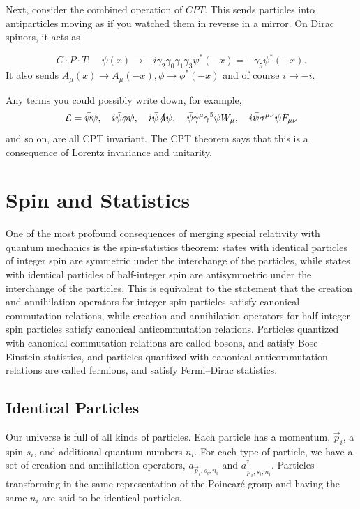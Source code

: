 \documentclass[11pt]{article}
\theoremstyle{definition}
\begin{document}
Next, consider the combined operation of \( CPT \). This sends particles into antiparticles moving as if you watched them in reverse in a mirror. On Dirac spinors, it acts as
\begin{shaded}
\begin{equation}
C \cdot P \cdot T : \quad \psi(x) \rightarrow -i\gamma_2\gamma_0\gamma_1\gamma_3\psi^*(-x) = -\gamma_5\psi^*(-x).
\end{equation}
It also sends \( A_{\mu}(x) \rightarrow A_{\mu}(-x), \phi \rightarrow \phi^*(-x) \) and of course \( i \rightarrow -i \).
\end{shaded}

Any terms you could possibly write down, for example,
\begin{equation}
\mathcal{L} = \bar{\psi}\psi, \quad i\bar{\psi}\phi\psi, \quad i\bar{\psi}\slashed{A}\psi, \quad \bar{\psi}\gamma^{\mu}\gamma^5\psi W_{\mu}, \quad i\bar{\psi}\sigma^{\mu\nu}\psi F_{\mu\nu}
\end{equation}
and so on, are all CPT invariant. The CPT theorem says that this is a consequence of Lorentz invariance and unitarity.

\section{Spin and Statistics}
One of the most profound consequences of merging special relativity with quantum mechanics is the spin-statistics theorem: states with identical particles of integer spin are symmetric under the interchange of the particles, while states with identical particles of half-integer spin are antisymmetric under the interchange of the particles. This is equivalent to the statement that the creation and annihilation operators for integer spin particles satisfy canonical commutation relations, while creation and annihilation operators for half-integer spin particles satisfy canonical anticommutation relations. Particles quantized with canonical commutation relations are called bosons, and satisfy Bose--Einstein statistics, and particles quantized with canonical anticommutation relations are called fermions, and satisfy Fermi--Dirac statistics.


\subsection{Identical Particles}
Our universe is full of all kinds of particles. Each particle has a momentum, $\vec{p}_i$, a spin $s_i$, and additional quantum numbers $n_i$. For each type of particle, we have a set of creation and annihilation operators, $a_{\vec{p}_i,s_i,n_i}$ and $a_{\vec{p}_i,s_i,n_i}^\dagger$. Particles transforming in the same representation of the Poincaré group and having the same $n_i$ are said to be identical particles.
\end{document}

